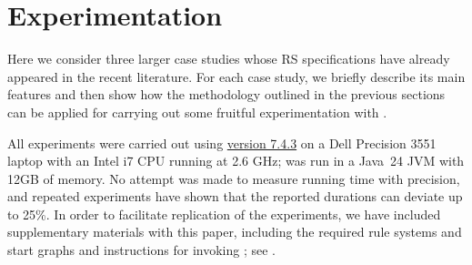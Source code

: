 
\section{Experimentation}\label{sec:experiments}

Here we consider 
three larger case studies whose RS specifications have already appeared in the recent literature. For each case study, we briefly describe its main features and then show how the methodology outlined in the previous sections can be applied for carrying out some fruitful experimentation with \GROOVE.

All \GROOVE experiments were carried out using \href{https://github.com/nl-utwente-groove/code/releases/tag/release-7_4_3}{\GROOVE version 7.4.3} on a Dell Precision 3551 laptop with an Intel i7 CPU running at 2.6 GHz; \GROOVE was run in a Java~24 JVM with 12GB of memory. No attempt was made to measure running time with precision, and repeated experiments have shown that the reported durations can deviate up to 25\%. In order to facilitate replication of the experiments, we have included supplementary materials with this paper, including the required rule systems and start graphs and instructions for invoking \GROOVE; see .
